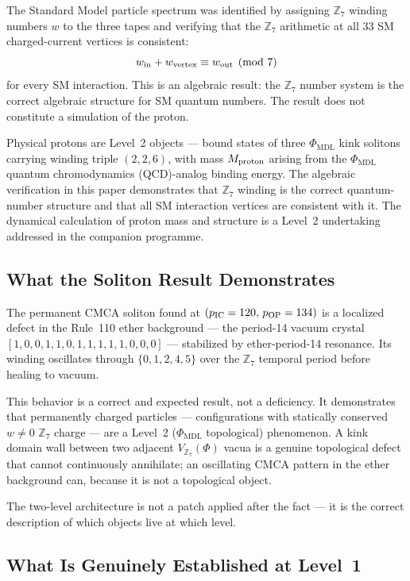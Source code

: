 \documentclass[11pt]{article}
\theoremstyle{remark}
\newcommand{\PHIMDL}{\Phi_{\mathrm{MDL}}}
\newcommand{\ZS}{\mathbb{Z}_7}
\newcommand{\CMCA}{\text{CMCA}}
\begin{document}
The Standard Model particle spectrum was identified by assigning $\ZS$ winding
numbers $w$ to the three tapes and verifying that the $\ZS$ arithmetic at all
33 SM charged-current vertices is consistent:
\[
  w_{\rm in} + w_{\rm vertex} \equiv w_{\rm out} \pmod{7}
\]
for every SM interaction. This is an algebraic result: the $\ZS$ number
system is the correct algebraic structure for SM quantum numbers. The result
does not constitute a simulation of the proton.

Physical protons are Level~2 objects — bound states of three $\PHIMDL$ kink
solitons carrying winding triple $(2,2,6)$, with mass $M_{\rm proton}$ arising
from the $\PHIMDL$ quantum chromodynamics (QCD)-analog binding energy. The algebraic verification in
this paper demonstrates that $\ZS$ winding is the correct quantum-number
structure and that all SM interaction vertices are consistent with it. The
dynamical calculation of proton mass and structure is a Level~2 undertaking
addressed in the companion programme.

\subsection{What the Soliton Result Demonstrates}

The permanent $\CMCA$ soliton found at $(p_{\rm IC} = 120,\, p_{\rm OP} = 134)$
is a localized defect in the Rule~110 ether background — the period-14 vacuum
crystal $[1,0,0,1,1,0,1,1,1,1,1,0,0,0]$ — stabilized by ether-period-14
resonance. Its winding oscillates through $\{0,1,2,4,5\}$ over the $\ZS$
temporal period before healing to vacuum.

This behavior is a correct and expected result, not a deficiency. It
demonstrates that permanently charged particles — configurations with
statically conserved $w \neq 0$ $\ZS$ charge — are a Level~2 ($\PHIMDL$
topological) phenomenon. A kink domain wall between two adjacent $V_{\ZS}(\Phi)$
vacua is a genuine topological defect that cannot continuously annihilate; an
oscillating $\CMCA$ pattern in the ether background can, because it is not a
topological object.

The two-level architecture is not a patch applied after the fact — it is the
correct description of which objects live at which level.

\subsection{What Is Genuinely Established at Level~1}
\end{document}
